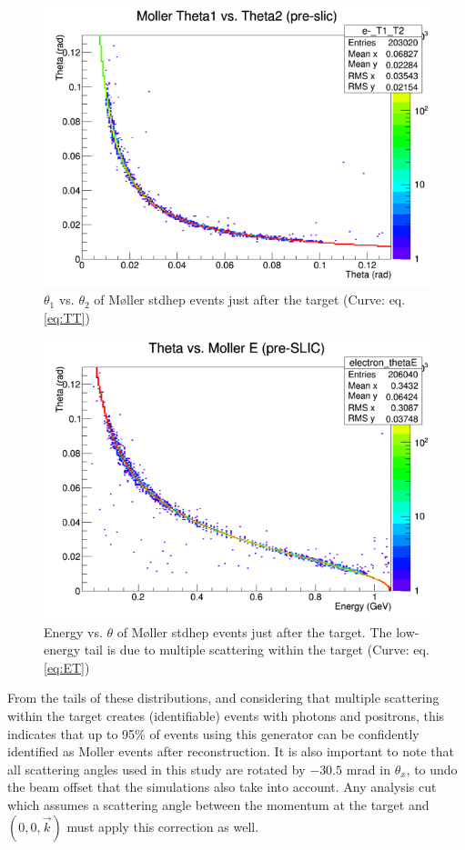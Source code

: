 \documentclass{article}
\begin{document}
	\begin{figure}[H]
  	\includegraphics[width=\linewidth]{old/stdTT.png}
  	\caption{$\theta_1$ vs. $\theta_2$ of M\o ller stdhep events just after the target (Curve: eq. \ref{eq:TT})}
  	\label{fig:stdTT}
	\end{figure}
	
	\begin{figure}[H]
  	\includegraphics[width=\linewidth]{old/stdET.png}
  	\caption{Energy vs. $\theta$ of M\o ller stdhep events just after the target. The low-energy tail is due to multiple scattering within the target (Curve: eq. \ref{eq:ET})}
  	\label{fig:stdET}
	\end{figure}

	From the tails of these distributions, and considering that multiple scattering within the target creates (identifiable) events with photons and positrons, this indicates that up to 95\% of events using this generator can be confidently identified as Moller events after reconstruction. It is also important to note that all scattering angles used in this study are rotated by $-30.5$ mrad in $\theta_x$, to undo the beam offset that the simulations also take into account. Any analysis cut which assumes a scattering angle between the momentum at the target and $(0,0,\vec{k})$ must apply this correction as well.
\end{document}
